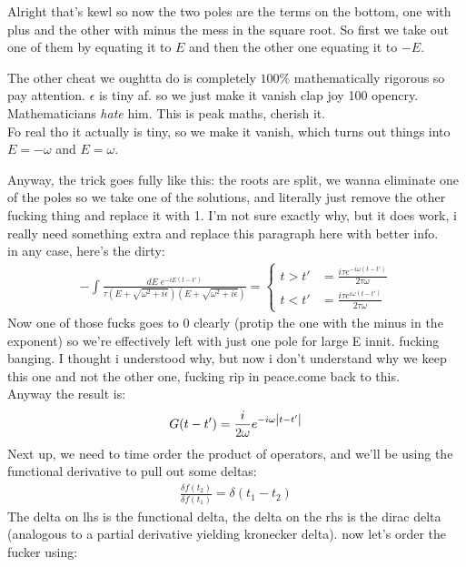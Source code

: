 \documentclass[10pt]{article}
\begin{document}
Alright that's kewl so now the two poles are the terms on the bottom, one with plus and the other with minus the mess in the square root. So first we take out one of them by equating it to $E$ and then the other one equating it to $-E$.\par
The other cheat we oughtta do is completely $100\%$ mathematically rigorous so pay attention. $\epsilon$ is tiny af. so we just make it vanish clap joy 100 opencry. Mathematicians \textit{hate} him. This is peak maths, cherish it.\\
Fo real tho it actually is tiny, so we make it vanish, which turns out things into $E=-\omega$ and $E=\omega$.\par
Anyway, the trick goes fully like this: the roots are split, we wanna eliminate one of the poles so we take one of the solutions, and literally just remove the other fucking thing and replace it with 1. I'm not sure exactly why, but it does work, i really need something extra and replace this paragraph here with better info. \\
in any case, here's the dirty:
\begin{align}
	-\int \frac{dE \; e^{-iE(t-t')}}{\tau\left( E + \sqrt{\omega^2 + i\epsilon}\right)\left( E + \sqrt{\omega^2 + i\epsilon}\right)}= \begin{cases}
		 t>t' &= \frac{i\tau e^{-i\omega(t-t')}}{2 \tau  \omega} \\
		 t<t' &= \frac{i\tau e^{i\omega(t-t')}}{2 \tau  \omega}
	 \end{cases}
\end{align}
Now one of those fucks goes to 0 clearly (protip the one with the minus in the exponent) so we're effectively left with just one pole for large E innit. fucking banging. I thought i understood why, but now i don't understand why we keep this one and not the other one, fucking rip in peace.come back to this. \\
Anyway the result is:
\begin{align}
	G(t-t') = \frac{i}{2\omega} e^{-i\omega\abs{t-t'}}
\end{align}
Next up, we need to time order the product of operators, and we'll be using the functional derivative to pull out some deltas:
\begin{align}
	\frac{\delta f(t_2)}{\delta f(t_1)} = \delta(t_1-t_2)
\end{align}
The delta on lhs is the functional delta, the delta on the rhs is the dirac delta (analogous to a partial derivative yielding kronecker delta). now let's order the fucker using:
\end{document}
